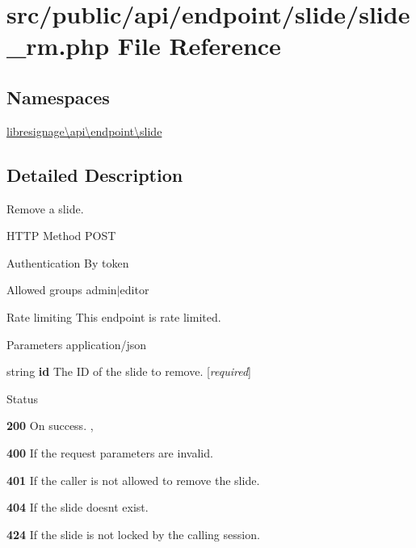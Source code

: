 \hypertarget{src_2public_2api_2endpoint_2slide_2slide__rm_8php}{}\section{src/public/api/endpoint/slide/slide\+\_\+rm.php File Reference}
\label{src_2public_2api_2endpoint_2slide_2slide__rm_8php}
\subsection*{Namespaces}
\begin{DoxyCompactItemize}
\item 
 \hyperlink{namespacelibresignage_1_1api_1_1endpoint_1_1slide}{libresignage\textbackslash{}api\textbackslash{}endpoint\textbackslash{}slide}
\end{DoxyCompactItemize}


\subsection{Detailed Description}
Remove a slide.

\begin{DoxyParagraph}{H\+T\+TP Method}
P\+O\+ST 
\end{DoxyParagraph}
\begin{DoxyParagraph}{Authentication}
By token 
\end{DoxyParagraph}
\begin{DoxyParagraph}{Allowed groups}
{\ttfamily admin$\vert$editor} 
\end{DoxyParagraph}
\begin{DoxyParagraph}{Rate limiting}
This endpoint is rate limited.
\end{DoxyParagraph}
\begin{DoxyParagraph}{Parameters}
application/json
\begin{DoxyItemize}
\item {\ttfamily string} {\bfseries id} The ID of the slide to remove. \mbox{[}{\itshape required}\mbox{]}
\end{DoxyItemize}
\end{DoxyParagraph}
\begin{DoxyParagraph}{Status}

\begin{DoxyItemize}
\item {\bfseries 200} On success. ,
\item {\bfseries 400} If the request parameters are invalid.
\item {\bfseries 401} If the caller is not allowed to remove the slide.
\item {\bfseries 404} If the slide doesn\textquotesingle{}t exist.
\item {\bfseries 424} If the slide is not locked by the calling session. 
\end{DoxyItemize}
\end{DoxyParagraph}
